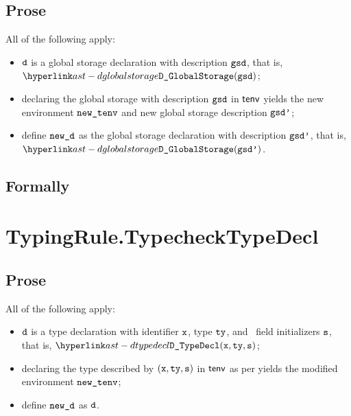 \subsection{Prose}
All of the following apply:
\begin{itemize}
  \item $\vd$ is a global storage declaration with description $\gsd$, that is, \\ $\DGlobalStorage(\gsd)$;
  \item declaring the global storage with description $\gsd$ in $\tenv$ yields the new environment
        $\newtenv$ and new global storage description $\gsdp$\ProseOrTypeError;
  \item define $\newd$ as the global storage declaration with description $\gsdp$, that is, \\ $\DGlobalStorage(\gsdp)$.
\end{itemize}


\subsection{Formally}
\begin{mathpar}
\end{mathpar}

\section{TypingRule.TypecheckTypeDecl \label{sec:TypingRule.TypecheckTypeDecl}}
\subsection{Prose}
All of the following apply:
\begin{itemize}
  \item $\vd$ is a type declaration with identifier $\vx$, type $\tty$,
        and \optional\ field initializers $\vs$, that is, $\DTypeDecl(\vx, \tty, \vs)$;
  \item declaring the type described by $(\vx, \tty, \vs)$ in $\tenv$
        as per  yields the modified environment $\newtenv$\ProseOrTypeError;
  \item define $\newd$ as $\vd$.
  \end{itemize}


